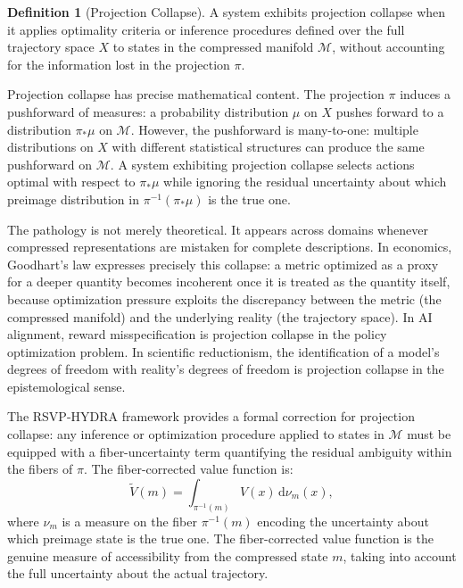 \documentclass[12pt, a4paper, openany]{book}
\theoremstyle{plain}
\theoremstyle{definition}
\newtheorem{definition}[theorem]{Definition}
\theoremstyle{remark}
\begin{document}
\begin{definition}[Projection Collapse]
A system exhibits projection collapse when it applies optimality criteria or inference procedures defined over the full trajectory space $X$ to states in the compressed manifold $\mathcal{M}$, without accounting for the information lost in the projection $\pi$.
\end{definition}

Projection collapse has precise mathematical content. The projection $\pi$ induces a pushforward of measures: a probability distribution $\mu$ on $X$ pushes forward to a distribution $\pi_* \mu$ on $\mathcal{M}$. However, the pushforward is many-to-one: multiple distributions on $X$ with different statistical structures can produce the same pushforward on $\mathcal{M}$. A system exhibiting projection collapse selects actions optimal with respect to $\pi_* \mu$ while ignoring the residual uncertainty about which preimage distribution in $\pi^{-1}(\pi_* \mu)$ is the true one.

The pathology is not merely theoretical. It appears across domains whenever compressed representations are mistaken for complete descriptions. In economics, Goodhart's law expresses precisely this collapse: a metric optimized as a proxy for a deeper quantity becomes incoherent once it is treated as the quantity itself, because optimization pressure exploits the discrepancy between the metric (the compressed manifold) and the underlying reality (the trajectory space). In AI alignment, reward misspecification is projection collapse in the policy optimization problem. In scientific reductionism, the identification of a model's degrees of freedom with reality's degrees of freedom is projection collapse in the epistemological sense.

The RSVP-HYDRA framework provides a formal correction for projection collapse: any inference or optimization procedure applied to states in $\mathcal{M}$ must be equipped with a fiber-uncertainty term quantifying the residual ambiguity within the fibers of $\pi$. The fiber-corrected value function is:
\[
\tilde{V}(m) = \int_{\pi^{-1}(m)} V(x) \, \mathrm{d}\nu_m(x),
\]
where $\nu_m$ is a measure on the fiber $\pi^{-1}(m)$ encoding the uncertainty about which preimage state is the true one. The fiber-corrected value function is the genuine measure of accessibility from the compressed state $m$, taking into account the full uncertainty about the actual trajectory.

\end{document}
